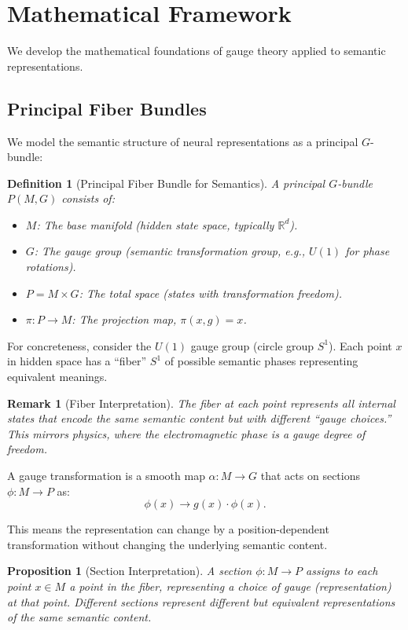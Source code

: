 \documentclass[12pt,letterpaper,twoside]{article}
\newtheorem{definition}{Definition}[section]
\newtheorem{remarque}{Remark}[section]
\newtheorem{prop}{Proposition}[section]
\begin{document}
\section{Mathematical Framework}

We develop the mathematical foundations of gauge theory applied to semantic representations.

\subsection{Principal Fiber Bundles}

We model the semantic structure of neural representations as a principal $G$-bundle:

\begin{definition}[Principal Fiber Bundle for Semantics]
A principal $G$-bundle $P(M, G)$ consists of:
\begin{itemize}
\item $M$: The base manifold (hidden state space, typically $\mathbb{R}^d$).
\item $G$: The gauge group (semantic transformation group, e.g., $U(1)$ for phase rotations).
\item $P = M \times G$: The total space (states with transformation freedom).
\item $\pi: P \to M$: The projection map, $\pi(x, g) = x$.
\end{itemize}
\end{definition}

For concreteness, consider the $U(1)$ gauge group (circle group $S^1$). Each point $x$ in hidden space has a ``fiber'' $S^1$ of possible semantic phases representing equivalent meanings.

\begin{remarque}[Fiber Interpretation]
The fiber at each point represents all internal states that encode the same semantic content but with different ``gauge choices.'' This mirrors physics, where the electromagnetic phase is a gauge degree of freedom.
\end{remarque}

A gauge transformation is a smooth map $\alpha: M \to G$ that acts on sections $\phi: M \to P$ as:
\[
\phi(x) \to g(x) \cdot \phi(x).
\]

This means the representation can change by a position-dependent transformation without changing the underlying semantic content.

\begin{prop}[Section Interpretation]
A section $\phi: M \to P$ assigns to each point $x \in M$ a point in the fiber, representing a choice of gauge (representation) at that point. Different sections represent different but equivalent representations of the same semantic content.
\end{prop}
\end{document}
